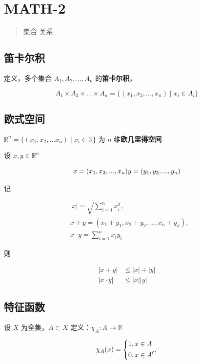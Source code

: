 \section{MATH-2}\label{math-2}

\begin{quote}
集合 关系
\end{quote}

\subsection{笛卡尔积}\label{ux7b1bux5361ux5c14ux79ef}

定义，多个集合 \(A_1,A_2,...,A_n\) 的\textbf{笛卡尔积}，

\[
A_1 \times A_2 \times ... \times A_n = 
\{ (x_1, x_2, ..., x_n)\mid x_i \in A_i \}
\]

\subsection{欧式空间}\label{ux6b27ux5f0fux7a7aux95f4}

\(\mathbb{R}^n=\{(x_1, x_2, ... x_n)\mid x_i\in\mathbb{R}\}\) 为 \(n\)
维\textbf{欧几里得空间}

设 \(x,y\in \mathbb{R}^n\)

\[
x=(x_1, x_2, ..., x_n)\\
y=(y_1, y_2, ..., y_n)
\]

记

\[
\begin{aligned}
&|x| =\sqrt{\sum_{i=1}^n x_i^2},\\
&x+y = (x_1+y_1, x_2+y_2, ... , x_n+y_n), \\
&x\cdot y=\sum_{i=1}^n x_i y_i
\end{aligned}
\]

则

\[
\begin{align}
|x+y| &\le |x| +|y| \\
|x\cdot y| &\le |x||y|
\end{align}
\]

\subsection{特征函数}\label{ux7279ux5f81ux51fdux6570}

设 \(X\) 为全集，\(A \subset X\)
定义：\(\chi_A:A\rightarrow \mathbb{R}\)

\[
\chi_A(x)=\left\{\begin{aligned} &1, \space  x \in A \\ 
&0, \space x \in A^C \end{aligned} \right.
\]


